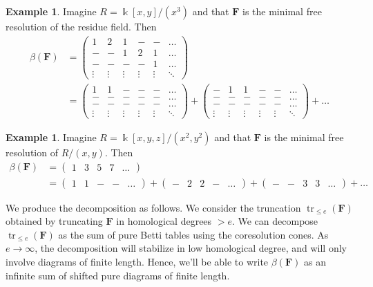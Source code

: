 \documentclass[12pt]{amsart}
\theoremstyle{definition}
\newtheorem{example}[lemma]{Example}
\theoremstyle{remark}
\newcommand{\tr}{\operatorname{tr}}
\newcommand{\kk}{\Bbbk}
\newcommand{\FF}{\mathbf{F}}
\begin{document}
\begin{example}
Imagine $R=\kk[x,y]/(x^3)$ and that $\FF$ is the minimal free resolution of the residue field.  Then
\begin{align*}
\beta(\FF)&=\begin{pmatrix}1&2&1&-&-&\dots \\ -&-&1&2&1&\dots \\-&-&-&-&1 &\dots \\ \vdots &\vdots &\vdots &\vdots &\vdots &\ddots \end{pmatrix}\\
&=\begin{pmatrix}1&1&-&-&-&\dots\\ -&-&-&-&-&\dots\\ -&-&-&-&-&\dots\\ \vdots &\vdots &\vdots &\vdots &\vdots &\ddots \end{pmatrix}+
\begin{pmatrix}-&1&1&-&-&\dots\\ -&-&-&-&-&\dots\\ -&-&-&-&-&\dots\\ \vdots &\vdots &\vdots &\vdots &\vdots &\ddots \end{pmatrix}+\dots
\end{align*}
\end{example}

\begin{example}
Imagine $R=\kk[x,y,z]/(x^2,y^2)$ and that $\FF$ is the minimal free resolution of $R/(x,y)$.  Then
\begin{align*}
\beta(\FF)&=\begin{pmatrix}1&3&5&7&\dots \end{pmatrix}\\
&=\begin{pmatrix}1&1&-&-&\dots \end{pmatrix}+\begin{pmatrix}-&2&2&-&\dots \end{pmatrix}+\begin{pmatrix}-&-&3&3&\dots \end{pmatrix}+\dots
\end{align*}
\end{example}

We produce the decomposition as follows.  We consider the truncation $\tr_{\leq e}(\FF)$ obtained by truncating $\FF$ in homological degrees $>e$.  We can decompose $\tr_{\leq e}(\FF)$ as the sum of pure Betti tables using the coresolution cones.  As $e\to \infty$, the decomposition will stabilize in low homological degree, and will only involve diagrams of finite length.  Hence, we'll be able to write $\beta(\FF)$ as an infinite sum of shifted pure diagrams of finite length.
\end{document}
